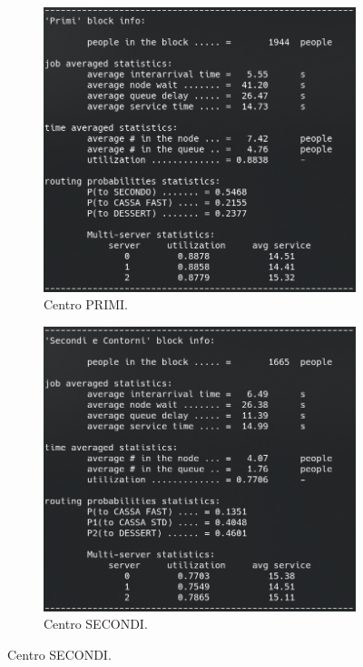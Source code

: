 \documentclass{article}
\begin{document}
\begin{figure}[H]
\begin{subfigure}{.5\textwidth}
  \centering
  \includegraphics[width=.9\linewidth]{img/migliorativo_2_1/primo.png}
  \caption{Centro PRIMI.}
  \label{fig:primo_ext_2_pol_1}
\end{subfigure}
\begin{subfigure}{.5\textwidth}
  \centering
  \includegraphics[width=.94\linewidth]{img/migliorativo_2_1/secondo.png}
  \caption{Centro SECONDI.}
  \label{fig:secondo_ext_2_pol_1}

\end{subfigure}
\end{figure}
\end{document}
